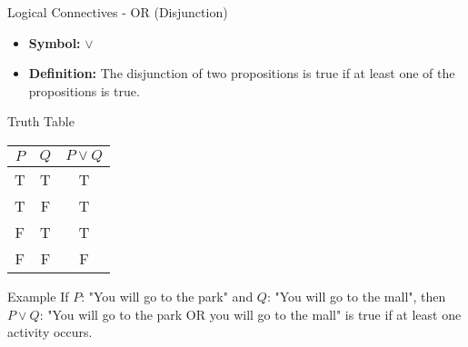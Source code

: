 \documentclass[aspectratio=169]{beamer}
\begin{document}
\begin{frame}[fragile]{Logical Connectives - OR (Disjunction)}
    \begin{itemize}
        \item \textbf{Symbol:} $\lor$
        \item \textbf{Definition:} The disjunction of two propositions is true if at least one of the propositions is true.
    \end{itemize}
    \begin{block}{Truth Table}
        \begin{tabular}{|c|c|c|}
            \hline
            $P$ & $Q$ & $P \lor Q$ \\
            \hline
            T & T & T \\
            T & F & T \\
            F & T & T \\
            F & F & F \\
            \hline
        \end{tabular}
    \end{block}
    \begin{block}{Example}
        If $P$: "You will go to the park" and $Q$: "You will go to the mall", then $P \lor Q$: "You will go to the park OR you will go to the mall" is true if at least one activity occurs.
    \end{block}
\end{frame}
\end{document}
